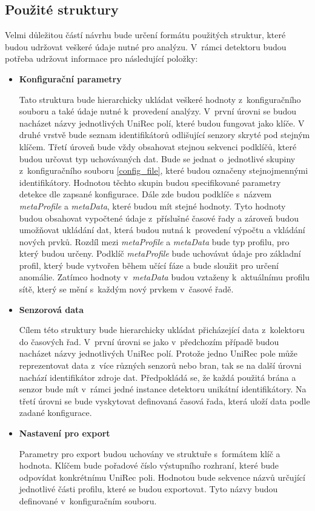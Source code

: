  \subsection{Použité struktury}
 Velmi důležitou částí návrhu bude určení formátu použitých struktur, které budou udržovat veškeré 
 údaje nutné pro analýzu. V~rámci detektoru budou potřeba udržovat informace pro následující
 položky:
  \begin{itemize}
   \item \textbf{Konfigurační parametry} \label{configParam}
   
   Tato struktura bude hierarchicky ukládat veškeré hodnoty z~konfiguračního souboru
   a také údaje nutné k~provedení analýzy. V~první úrovni se budou nacházet názvy jednotlivých 
   UniRec polí, které budou fungovat jako klíče. V druhé vrstvě bude seznam identifikátorů 
   odlišující senzory skryté pod stejným klíčem.
   Třetí úroveň bude vždy obsahovat stejnou 
   sekvenci podklíčů, které budou určovat typ uchovávaných dat. Bude se jednat o~jednotlivé 
   skupiny z~konfiguračního souboru \ref{config_file}, které budou označeny stejnojmennými
   identifikátory. Hodnotou těchto skupin budou specifikované parametry detekce dle zapsané
   konfigurace. Dále zde budou podklíče s~názvem \textit{metaProfile} a \textit{metaData},
   které budou mít
   stejné hodnoty. Tyto hodnoty budou obsahovat vypočtené údaje z~příslušné časové řady
   a zároveň budou umožňovat ukládání dat, která budou nutná k~provedení výpočtu 
   a vkládání nových prvků. Rozdíl mezi \textit{metaProfile} a \textit{metaData} bude typ profilu,
   pro který budou určeny. Podklíč \textit{metaProfile} bude uchovávat údaje pro základní profil,
   který bude vytvořen během učící fáze a bude sloužit pro určení anomálie. Zatímco 
   hodnoty v~\textit{metaData} budou vztaženy k~aktuálnímu profilu sítě, který se mění s~každým
   nový prvkem v~časové řadě.
   
   \item \textbf{Senzorová data}
   
   Cílem této struktury bude hierarchicky ukládat přicházející data z~kolektoru do časových řad. 
   V~první úrovni se jako v~předchozím případě budou nacházet názvy jednotlivých UniRec polí. 
   Protože jedno UniRec pole může reprezentovat data z~více různých senzorů nebo bran, tak se na 
   další úrovni nachází identifikátor zdroje dat. Předpokládá se, že každá použitá brána a senzor 
   bude mít v~rámci jedné instance detektoru unikátní identifikátory. Na třetí úrovni se bude vyskytovat 
   definovaná časová řada, která uloží data podle zadané konfigurace.
   
   \item \textbf{Nastavení pro export} 
   
   Parametry pro export budou uchovány ve struktuře s~formátem klíč a hodnota. Klíčem bude 
   pořadové číslo výstupního rozhraní, které bude odpovídat konkrétnímu UniRec poli. Hodnotou 
   bude sekvence názvů určující jednotlivé části profilu, které se budou exportovat. Tyto názvy
   budou definované v~konfiguračním souboru. 
   
  \end{itemize}

